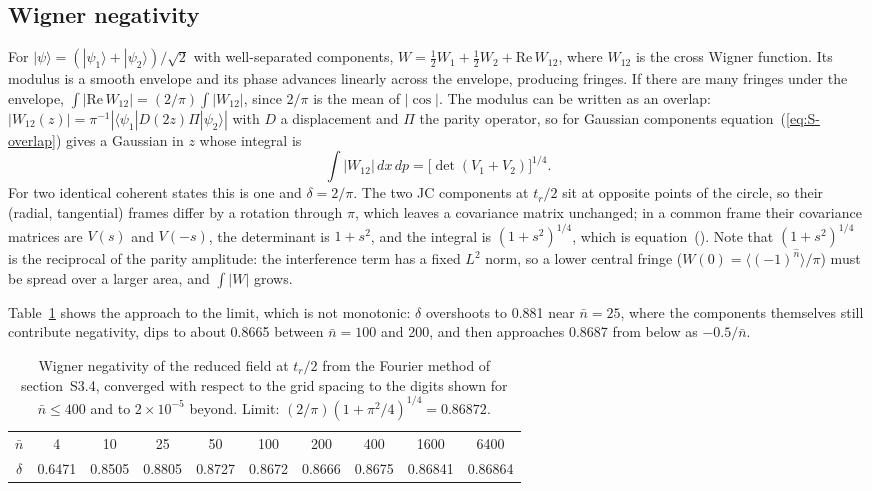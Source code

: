 \documentclass{iopjournal}
\newcommand{\nbar}{\bar{n}}
\newcommand{\ket}[1]{|#1\rangle}
\newcommand{\bra}[1]{\langle #1|}
\begin{document}
\subsection{Wigner negativity}
For $\ket{\psi} = (\ket{\psi_1}+\ket{\psi_2})/\sqrt2$ with well-separated components, $W = \tfrac12W_1+\tfrac12W_2+\mathrm{Re}\,W_{12}$, where $W_{12}$ is the cross Wigner function. Its modulus is a smooth envelope and its phase advances linearly across the envelope, producing fringes. If there are many fringes under the envelope, $\int|\mathrm{Re}\,W_{12}| = (2/\pi)\int|W_{12}|$, since $2/\pi$ is the mean of $|\cos|$. The modulus can be written as an overlap: $|W_{12}(z)| = \pi^{-1}|\bra{\psi_1}D(2z)\Pi\ket{\psi_2}|$ with $D$ a displacement and $\Pi$ the parity operator, so for Gaussian components equation~(\ref{eq:S-overlap}) gives a Gaussian in $z$ whose integral is
\begin{equation}
\int|W_{12}|\,dx\,dp = \big[\det(V_1+V_2)\big]^{1/4}.
\end{equation}
For two identical coherent states this is one and $\delta = 2/\pi$. The two JC components at $t_r/2$ sit at opposite points of the circle, so their (radial, tangential) frames differ by a rotation through $\pi$, which leaves a covariance matrix unchanged; in a common frame their covariance matrices are $V(s)$ and $V(-s)$, the determinant is $1+s^2$, and the integral is $(1+s^2)^{1/4}$, which is equation~(). Note that $(1+s^2)^{1/4}$ is the reciprocal of the parity amplitude: the interference term has a fixed $L^2$ norm, so a lower central fringe ($W(0) = \langle(-1)^{\hat n}\rangle/\pi$) must be spread over a larger area, and $\int|W|$ grows.

Table~\ref{tab:S-delta} shows the approach to the limit, which is not monotonic: $\delta$ overshoots to 0.881 near $\nbar = 25$, where the components themselves still contribute negativity, dips to about 0.8665 between $\nbar = 100$ and 200, and then approaches 0.8687 from below as $-0.5/\nbar$.

\begin{table}
\centering
\caption{Wigner negativity of the reduced field at $t_r/2$ from the Fourier method of section~S3.4, converged with respect to the grid spacing to the digits shown for $\nbar\leq400$ and to $2\times10^{-5}$ beyond. Limit: $(2/\pi)(1+\pi^2/4)^{1/4} = 0.86872$.}
\begin{tabular}{cccccccccc}
\hline
$\nbar$ & 4 & 10 & 25 & 50 & 100 & 200 & 400 & 1600 & 6400 \\
$\delta$ & 0.6471 & 0.8505 & 0.8805 & 0.8727 & 0.8672 & 0.8666 & 0.8675 & 0.86841 & 0.86864 \\
\hline
\end{tabular}
\label{tab:S-delta}
\end{table}
\end{document}
